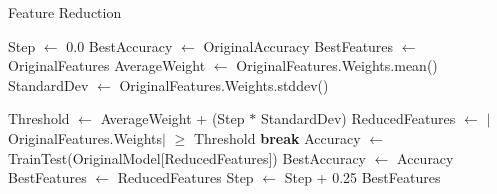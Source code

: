 
    
    
    
    
    
    

\begin{algorithm}[h]
    \caption{Feature Reduction}
    \label{alg:feature_alg}
    \begin{algorithmic}
        \State Step $\leftarrow$ 0.0
        \State BestAccuracy $\leftarrow$ OriginalAccuracy
        \State BestFeatures $\leftarrow$ OriginalFeatures
        \State AverageWeight $\leftarrow$ OriginalFeatures.Weights.mean()
        \State StandardDev $\leftarrow$ OriginalFeatures.Weights.stddev()
        
            \State Threshold $\leftarrow$ AverageWeight + (Step $*$ StandardDev)
            \State ReducedFeatures $\leftarrow$ $|$OriginalFeatures.Weights$|$ $\geq$ Threshold
                \State \textbf{break}
            \EndIf
            \State Accuracy $\leftarrow$ TrainTest(OriginalModel[ReducedFeatures])
                \State BestAccuracy $\leftarrow$ Accuracy
                \State BestFeatures $\leftarrow$ ReducedFeatures
            \EndIf
            \State Step $\leftarrow$ Step + 0.25
        \EndWhile
        \Return BestFeatures
    \end{algorithmic}
\end{algorithm}